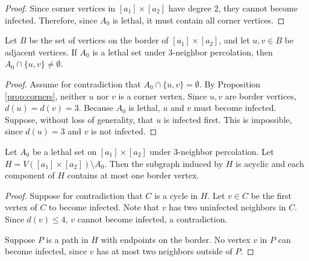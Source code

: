 \begin{proof}
Since corner vertices in $[a_1] \times [a_2]$ have degree 2, they cannot become infected. Therefore, since $A_0$ is lethal, it must contain all corner vertices.
\end{proof}

\begin{prop}
\label{prop:border}
Let $B$ be the set of vertices on the border of $[a_1] \times [a_2]$, and let $u,v \in B$ be adjacent vertices. If $A_0$ is a lethal set under 3-neighbor percolation, then $A_0 \cap \{u,v\} \neq \emptyset$.
\end{prop}

\begin{proof}
Assume for contradiction that $A_0 \cap \{u,v\} = \emptyset$. By Proposition \ref{prop:corners}, neither $u$ nor $v$ is a corner vertex. Since $u,v$ are border vertices, $d(u) = d(v) = 3$. Because $A_0$ is lethal, $u$ and $v$ must become infected. Suppose, without loss of generality, that $u$ is infected first. This is impossible, since $d(u) = 3$ and $v$ is not infected.
\end{proof}

\begin{prop}
\label{prop:immune_regions}
Let $A_0$ be a lethal set on $[a_1] \times [a_2]$ under 3-neighbor percolation. Let $H = V([a_1] \times [a_2]) \setminus A_0$. Then the subgraph induced by $H$ is acyclic and each component of $H$ contains at most one border vertex.
\end{prop}

\begin{proof}
Suppose for contradiction that $C$ is a cycle in $H$. Let $v \in C$ be the first vertex of $C$ to become infected. Note that $v$ has two uninfected neighbors in $C$. Since $d(v) \leq 4$, $v$ cannot become infected, a contradiction.

Suppose $P$ is a path in $H$ with endpoints on the border. No vertex $v$ in $P$ can become infected, since $v$ has at most two neighbors outside of $P$.
\end{proof}

